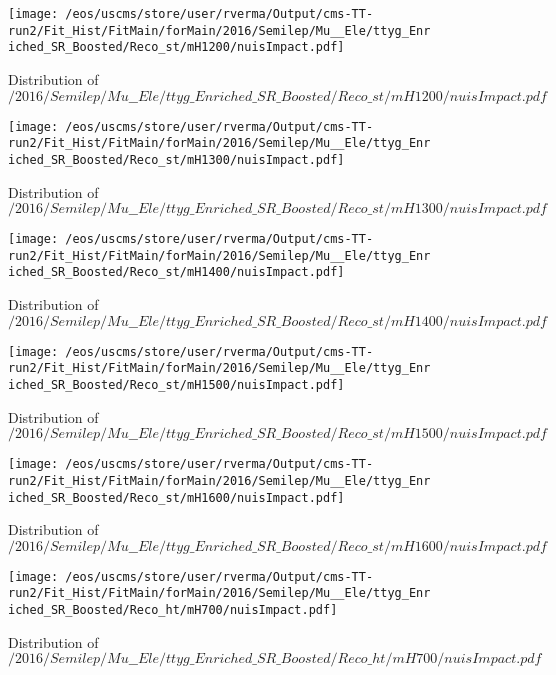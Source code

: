 \begin{figure}
\centering
\texttt{[image: /eos/uscms/store/user/rverma/Output/cms-TT-run2/Fit\_Hist/FitMain/forMain/2016/Semilep/Mu\_\_Ele/ttyg\_Enriched\_SR\_Boosted/Reco\_st/mH1200/nuisImpact.pdf]}
\caption{Distribution of $/2016/Semilep/Mu\_\_Ele/ttyg\_Enriched\_SR\_Boosted/Reco\_st/mH1200/nuisImpact.pdf$}
\end{figure}

\begin{figure}
\centering
\texttt{[image: /eos/uscms/store/user/rverma/Output/cms-TT-run2/Fit\_Hist/FitMain/forMain/2016/Semilep/Mu\_\_Ele/ttyg\_Enriched\_SR\_Boosted/Reco\_st/mH1300/nuisImpact.pdf]}
\caption{Distribution of $/2016/Semilep/Mu\_\_Ele/ttyg\_Enriched\_SR\_Boosted/Reco\_st/mH1300/nuisImpact.pdf$}
\end{figure}

\begin{figure}
\centering
\texttt{[image: /eos/uscms/store/user/rverma/Output/cms-TT-run2/Fit\_Hist/FitMain/forMain/2016/Semilep/Mu\_\_Ele/ttyg\_Enriched\_SR\_Boosted/Reco\_st/mH1400/nuisImpact.pdf]}
\caption{Distribution of $/2016/Semilep/Mu\_\_Ele/ttyg\_Enriched\_SR\_Boosted/Reco\_st/mH1400/nuisImpact.pdf$}
\end{figure}

\begin{figure}
\centering
\texttt{[image: /eos/uscms/store/user/rverma/Output/cms-TT-run2/Fit\_Hist/FitMain/forMain/2016/Semilep/Mu\_\_Ele/ttyg\_Enriched\_SR\_Boosted/Reco\_st/mH1500/nuisImpact.pdf]}
\caption{Distribution of $/2016/Semilep/Mu\_\_Ele/ttyg\_Enriched\_SR\_Boosted/Reco\_st/mH1500/nuisImpact.pdf$}
\end{figure}

\begin{figure}
\centering
\texttt{[image: /eos/uscms/store/user/rverma/Output/cms-TT-run2/Fit\_Hist/FitMain/forMain/2016/Semilep/Mu\_\_Ele/ttyg\_Enriched\_SR\_Boosted/Reco\_st/mH1600/nuisImpact.pdf]}
\caption{Distribution of $/2016/Semilep/Mu\_\_Ele/ttyg\_Enriched\_SR\_Boosted/Reco\_st/mH1600/nuisImpact.pdf$}
\end{figure}

\begin{figure}
\centering
\texttt{[image: /eos/uscms/store/user/rverma/Output/cms-TT-run2/Fit\_Hist/FitMain/forMain/2016/Semilep/Mu\_\_Ele/ttyg\_Enriched\_SR\_Boosted/Reco\_ht/mH700/nuisImpact.pdf]}
\caption{Distribution of $/2016/Semilep/Mu\_\_Ele/ttyg\_Enriched\_SR\_Boosted/Reco\_ht/mH700/nuisImpact.pdf$}
\end{figure}


